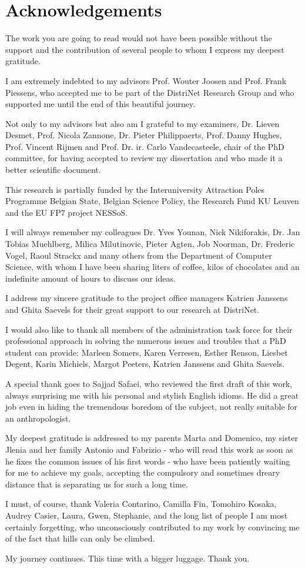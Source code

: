 \section*{Acknowledgements}
{\parindent0pt 
The work you are going to read would not have been possible without the support and the contribution of several people to whom I express my deepest gratitude.

I am extremely indebted to my advisors Prof. Wouter Joosen and Prof. Frank Piessens, who accepted me to be part of the DistriNet Research Group and who supported me until the end of this beautiful journey.  

Not only to my advisors but also am I grateful to my examiners, Dr. Lieven Desmet, Prof. Nicola Zannone, Dr. Pieter Philippaerts, Prof. Danny Hughes, Prof. Vincent Rijmen and Prof. Dr. ir. Carlo Vandecasteele, chair of the PhD committee, for having accepted to review my dissertation and who made it a better scientific document.

This research is partially funded by the Interuniversity Attraction Poles Programme Belgian State, Belgian Science Policy, the Research Fund KU Leuven and the EU FP7 project NESSoS.

I will always remember my colleagues Dr. Yves Younan, Nick Nikiforakis, Dr. Jan Tobias Muehlberg, Milica Milutinovic, Pieter Agten, Job Noorman, Dr. Frederic Vogel, Raoul Strackx and many others from the Department of Computer Science, with whom I have been sharing liters of coffee, kilos of chocolates and an indefinite amount of hours to discuss our ideas.

I address my sincere gratitude to the project office managers Katrien Janssens and Ghita Saevels for their great support to our research at DistriNet.

I would also like to thank all members of the administration task force for their professional approach in solving the numerous issues and troubles that a PhD student can provide: Marleen Somers, Karen Verresen, Esther Renson, Liesbet Degent, Karin Michiels, Margot Peeters, Katrien Janssens and Ghita Saevels.

A special thank goes to Sajjad Safaei, who reviewed the first draft of this work, always surprising me with his personal and stylish English idioms. He did a great job even in hiding the tremendous boredom of the subject, not really suitable for an anthropologist.


My deepest gratitude is addressed to my parents Marta and Domenico, my sister Jlenia and her family Antonio and Fabrizio - who will read this work as soon as he fixes the common issues of his first words - who have been patiently waiting for me to achieve my goals, accepting the compulsory and sometimes dreary distance that is separating us for such a long time.


I must, of course, thank Valeria Contarino, Camilla Fin, Tomohiro Kosaka, Audrey Casier, Laura, Gwen, Stephanie,  and the long list of people I am most certainly forgetting, who unconsciously contributed to my work by convincing me of the fact that hills can only be climbed.  


My journey continues. This time with a bigger luggage. Thank you.
}

